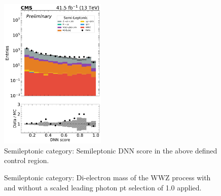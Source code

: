 \begin{figure}[h!]
    \centering
    \includegraphics[width=0.45\textwidth]{Sections/HHWWgg/images/DNN_andSignal_Validation/log/evalDNN_HH_HHWWggTag_0.pdf}
    \caption{Semileptonic category: Semileptonic DNN score in the above defined control region. \label{fig:SL_DNN_CR}}
\end{figure}

\begin{figure}[!h]
    \setcounter{subfigure}{0}
    \centering
    \qquad
    \caption{Semileptonic category: Di-electron mass of the WWZ process with and without a scaled leading photon pt selection of 1.0 applied. \label{fig:SL_diEleMass_WWZ}
    }
\end{figure}


